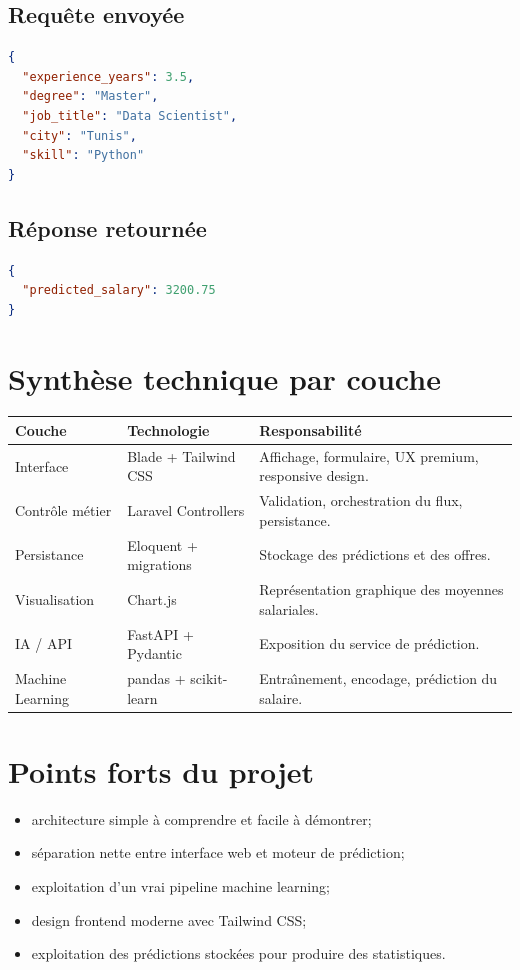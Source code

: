 \documentclass[11pt,a4paper]{article}
\begin{document}
\subsection{Requ\^ete envoy\'ee}
\begin{lstlisting}[language=json, caption={Exemple de payload JSON}]
{
  "experience_years": 3.5,
  "degree": "Master",
  "job_title": "Data Scientist",
  "city": "Tunis",
  "skill": "Python"
}
\end{lstlisting}

\subsection{R\'eponse retourn\'ee}
\begin{lstlisting}[language=json, caption={Reponse JSON simplifiee}]
{
  "predicted_salary": 3200.75
}
\end{lstlisting}

\section{Synth\`ese technique par couche}
\begin{longtable}{p{3.5cm}p{4.5cm}p{6.5cm}}
\toprule
\textbf{Couche} & \textbf{Technologie} & \textbf{Responsabilit\'e} \\
\midrule
\endhead
Interface & Blade + Tailwind CSS & Affichage, formulaire, UX premium, responsive design. \\
Contr\^ole m\'etier & Laravel Controllers & Validation, orchestration du flux, persistance. \\
Persistance & Eloquent + migrations & Stockage des pr\'edictions et des offres. \\
Visualisation & Chart.js & Repr\'esentation graphique des moyennes salariales. \\
IA / API & FastAPI + Pydantic & Exposition du service de pr\'ediction. \\
Machine Learning & pandas + scikit-learn & Entra\^\i nement, encodage, pr\'ediction du salaire. \\
\bottomrule
\end{longtable}

\section{Points forts du projet}
\begin{itemize}[leftmargin=1.2cm]
    \item architecture simple \`a comprendre et facile \`a d\'emontrer;
    \item s\'eparation nette entre interface web et moteur de pr\'ediction;
    \item exploitation d'un vrai pipeline machine learning;
    \item design frontend moderne avec Tailwind CSS;
    \item exploitation des pr\'edictions stock\'ees pour produire des statistiques.
\end{itemize}
\end{document}
